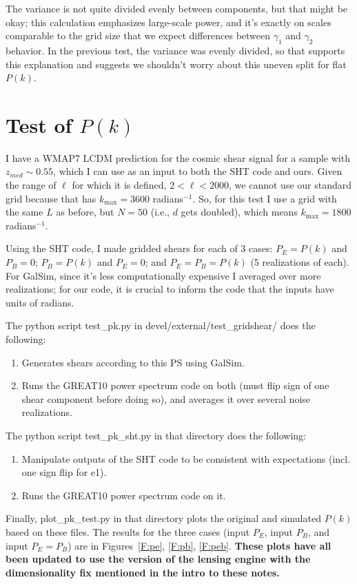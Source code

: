 \documentclass[preprint]{aastex}
\newcommand{\kmax}{\ensuremath{k_\mathrm{max}}}
\begin{document}
The variance is not quite divided evenly between components, but that
might be okay; this calculation emphasizes large-scale power, and it's
exactly on scales comparable to the grid size that we expect
differences between $\gamma_1$ and $\gamma_2$ behavior.  In the
previous test, the variance was evenly divided, so that supports this
explanation and suggests we shouldn't worry about this uneven split
for flat $P(k)$.

\section{Test of $P(k)$}\label{S:testpk}

I have a WMAP7 LCDM prediction for the cosmic shear signal for a
sample with $z_{med}\sim 0.55$, which I can use as an input to both
the SHT code and ours.  Given the range of $\ell$ for which it is
defined, $2<\ell<2000$, we cannot use our standard grid because that
has $\kmax=3600$ radians$^{-1}$.  So, for this test I use a grid with
the same $L$ as before, but $N=50$ (i.e., $d$ gets doubled), which
means $\kmax=1800$ radians$^{-1}$.

Using the SHT code, I made gridded shears for each of 3 cases:
$P_E=P(k)$ and $P_B=0$; $P_B=P(k)$ and $P_E=0$; and $P_E=P_B=P(k)$ (5
realizations of each).
For GalSim, since it's less computationally expensive I averaged over
more realizations; for our code, it is crucial to inform the code that
the inputs have units of radians.

The python script test\_pk.py in devel/external/test\_gridshear/ does the following:
\begin{enumerate}
\item Generates shears according to this PS using GalSim.
\item Runs the GREAT10 power spectrum code on both (must flip sign of
  one shear component before doing so), and averages it over several
  noise realizations.
\end{enumerate}

The python script test\_pk\_sht.py in that directory does the following:
\begin{enumerate}
\item Manipulate outputs of the SHT code to be consistent with
  expectations (incl. one sign flip for e1).
\item Runs the GREAT10 power spectrum code on it.
\end{enumerate}

Finally, plot\_pk\_test.py in that directory plots the original and
simulated $P(k)$ based on these files.  The results for the three
cases (input $P_E$, input $P_B$, and input $P_E=P_B$) are in
Figures~\ref{F:pe}, \ref{F:pb}, \ref{F:peb}.  \textbf{These plots have
  all been updated to use the version of the lensing engine with the
  dimensionality fix mentioned in the intro to these notes.}
\end{document}
